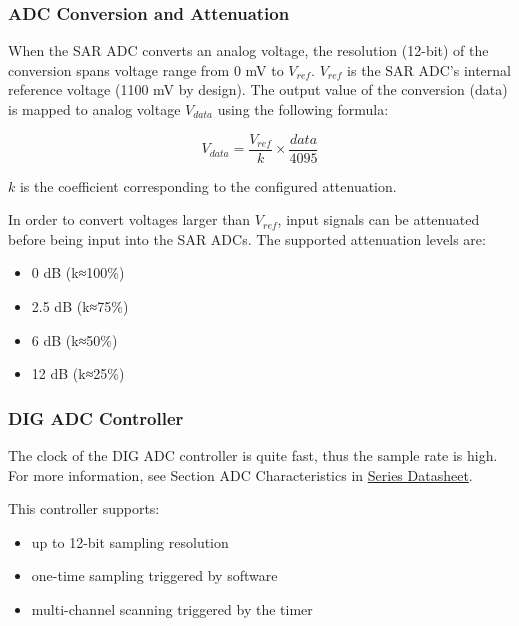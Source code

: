 \documentclass[main\_\_EN.tex]{subfiles}
\begin{document}
\subsubsection{ADC Conversion and Attenuation}

When the SAR ADC converts an analog voltage, the resolution (12-bit) of the conversion spans voltage range from 0 mV to \(V_{ref}\). \(V_{ref}\) is the SAR ADC's internal reference voltage (1100 mV by design). The output value of the conversion (data) is mapped to analog voltage \(V_{data}\) using the following formula:

    \[
    V_{data} = \frac{V_{ref}}{k}\times{\frac{data}{4095}}
    \]

\(k\) is the coefficient corresponding to the configured attenuation.

In order to convert voltages larger than \(V_{ref}\), input signals can be attenuated before being input into the SAR ADCs. The supported attenuation levels are:

\begin{itemize}
    \item 0 dB (k≈100\%)
    \item 2.5 dB (k≈75\%)
    \item 6 dB (k≈50\%)
    \item 12 dB (k≈25\%)
\end{itemize}

\subsubsection{DIG ADC Controller}

The clock of the DIG ADC controller is quite fast, thus the sample rate is high. For more information, see Section ADC Characteristics in \href{https://www.espressif.com/sites/default/files/documentation/esp8684_datasheet_en.pdf}{\chipname{} Series Datasheet}.

This controller supports:

\begin{itemize}
    \item up to 12-bit sampling resolution
    \item one-time sampling triggered by software
    \item multi-channel scanning triggered by the timer
\end{itemize}
\end{document}
